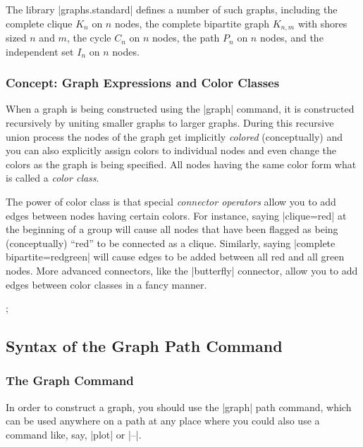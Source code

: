 The library |graphs.standard| defines a number of such graphs, including the
complete clique $K_n$ on $n$ nodes, the complete bipartite graph $K_{n,m}$ with
shores sized $n$ and $m$, the cycle $C_n$ on $n$ nodes, the path $P_n$ on $n$
nodes, and the independent set $I_n$ on $n$ nodes.


\subsubsection{Concept: Graph Expressions and Color Classes}

When a graph is being constructed using the |graph| command, it is constructed
recursively by uniting smaller graphs to larger graphs. During this recursive
union process the nodes of the graph get implicitly \emph{colored}
(conceptually) and you can also explicitly assign colors to individual nodes
and even change the colors as the graph is being specified. All nodes having
the same color form what is called a \emph{color class}.

The power of color class is that special \emph{connector operators} allow you
to add edges between nodes having certain colors. For instance, saying
|clique=red| at the beginning of a group will cause all nodes that have been
flagged as being (conceptually) ``red'' to be connected as a clique. Similarly,
saying |complete bipartite={red}{green}| will cause edges to be added between
all red and all green nodes. More advanced connectors, like the |butterfly|
connector, allow you to add edges between color classes in a fancy manner.
%
\begin{codeexample}[]
\tikz [x=8mm, y=6mm, circle]
  ;
\end{codeexample}


\subsection{Syntax of the Graph Path Command}

\subsubsection{The Graph Command}

In order to construct a graph, you should use the |graph| path command, which
can be used anywhere on a path at any place where you could also use a command
like, say, |plot| or |--|.

